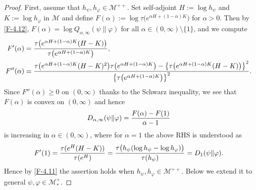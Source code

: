 \documentclass[12pt]{article}
\theoremstyle{definition}
\theoremstyle{remark}
\numberwithin{equation}{section}
\def\Me{\mathcal M}
\def\ffi{\varphi}
\begin{document}
\begin{proof}
First, assume that $h_\psi,h_\ffi\in\Me^{++}$. Set self-adjoint $H:=\log h_\psi$ and $K:=\log h_\ffi$ in $\Me$
and define $F(\alpha):=\log\tau\bigl(e^{\alpha H+(1-\alpha)K}\bigr)$ for $\alpha>0$.
Then by \eqref{F-4.12}, $F(\alpha)=\log Q_{\alpha,\infty}(\psi\|\ffi)$ for all $\alpha\in(0,\infty)\setminus\{1\}$,
and we compute
\begin{align*}
F'(\alpha)&={\tau\bigl(e^{\alpha H+(1-\alpha)K}(H-K)\bigr)\over\tau\bigl(e^{\alpha H+(1-\alpha)K}\bigr)}, \\
F''(\alpha)&={\tau\bigl(e^{\alpha H+(1-\alpha)K}(H-K)^2\bigr)\tau\bigl(e^{\alpha
H+(1-\alpha)K}\bigr)-\bigl\{\tau\bigl(e^{\alpha H+(1-\alpha)K}(H-K)\bigr)\bigr\}^2
\over\bigl\{\tau\bigl(e^{\alpha H+(1-\alpha)K}\bigr)\bigr\}^2}.
\end{align*}
Since $F''(\alpha)\ge0$ on $(0,\infty)$ thanks to the Schwarz inequality, we see that $F(\alpha)$ is
convex on $(0,\infty)$ and hence
\[
D_{\alpha,\infty}(\psi\|\ffi)={F(\alpha)-F(1)\over\alpha-1}
\]
is increasing in $\alpha\in(0,\infty)$, where for $\alpha=1$ the above RHS is understood as
\[
F'(1)={\tau(e^H(H-K))\over\tau(e^H)}={\tau\bigl(h_\psi(\log h_\psi-\log h_\ffi)\bigr)\over\tau(h_\psi)}
=D_1(\psi\|\ffi).
\]
Hence by \eqref{F-4.11} the assertion holds when $h_\psi,h_\ffi\in\Me^{++}$. Below we extend it to general
$\psi,\ffi\in\Me_*^+$.


\end{proof}
\end{document}
